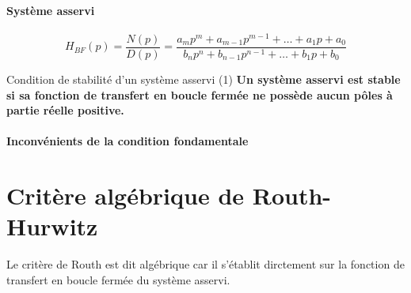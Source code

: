 \paragraph{Système asservi}
\begin{center}
    
\end{center}
\[
H_{BF}(p)=\dfrac{N(p)}{D(p)}=\dfrac{a_mp^m+a_{m-1}p^{m-1}+\ldots+a_1p+a_0}
                                   {b_np^n+b_{n-1}p^{n-1}+\ldots+b_1p+b_0}
\]
\begin{criteria}{Condition de stabilité d'un système asservi (1)}
    \textbf{Un système asservi est stable si sa fonction de transfert en 
            boucle fermée ne possède aucun pôles à partie réelle positive.}
\end{criteria}
\paragraph{Inconvénients de la condition fondamentale}
\newpage
{}
\captionsetup{width=0.9\linewidth}
\section{Critère algébrique de Routh-Hurwitz
}
Le critère de Routh est dit algébrique car il s'établit 
dirctement sur la fonction de transfert en boucle fermée du système asservi. 

